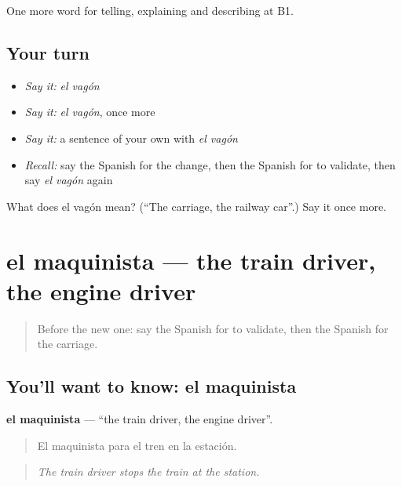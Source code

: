 \begin{grammarlens}[title={What you've built}]
One more word for telling, explaining and describing at B1.
\end{grammarlens}

\subsection*{Your turn}
\begin{itemize}
\raggedright
  \item \emph{Say it:} \emph{el vagón}
  \item \emph{Say it:} \emph{el vagón}, once more
  \item \emph{Say it:} a sentence of your own with \emph{el vagón}
  \item \emph{Recall:} say the Spanish for the change, then the Spanish for to validate, then say \emph{el vagón} again
\end{itemize}

\begin{tcolorbox}[breakable,colback=teal!4,colframe=teal!35!black,title={Before you move on}]
What does el vagón mean? (\textquotedblleft{}The carriage, the railway car\textquotedblright{}.) Say it once more.
\end{tcolorbox}
\section[el maquinista]{el maquinista — the train driver, the engine driver}

\label{lesson:ES-C651-maquinista}



\begin{quote}
Before the new one: say the Spanish for to validate, then the Spanish for the carriage.
\end{quote}

\subsection*{You'll want to know: el maquinista}
\textbf{el maquinista} — \textquotedblleft{}the train driver, the engine driver\textquotedblright{}.

\begin{quote}
El maquinista para el tren en la estación.
\end{quote}

\begin{quote}
\emph{The train driver stops the train at the station.}
\end{quote}

